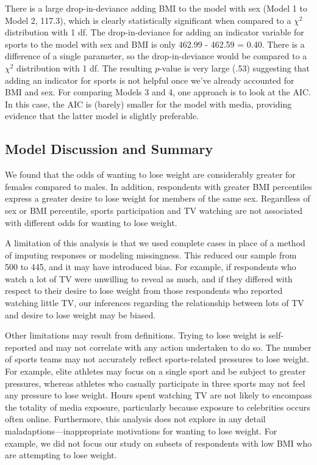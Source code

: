 \documentclass[
]{krantz}
\begin{document}
There is a large drop-in-deviance adding BMI to the model with sex (Model 1 to Model 2, 117.3), which is clearly statistically significant when compared to a \(\chi^2\) distribution with 1 df. The drop-in-deviance for adding an indicator variable for sports to the model with sex and BMI is only 462.99 - 462.59 = 0.40. There is a difference of a single parameter, so the drop-in-deviance would be compared to a \(\chi^2\) distribution with 1 df. The resulting \(p\)-value is very large (.53) suggesting that adding an indicator for sports is not helpful once we've already accounted for BMI and sex. For comparing Models 3 and 4, one approach is to look at the AIC. In this case, the AIC is (barely) smaller for the model with media, providing evidence that the latter model is slightly preferable.

\subsection{Model Discussion and Summary}\label{model-discussion-and-summary}

We found that the odds of wanting to lose weight are considerably greater for females compared to males. In addition, respondents with greater BMI percentiles express a greater desire to lose weight for members of the same sex. Regardless of sex or BMI percentile, sports participation and TV watching are not associated with different odds for wanting to lose weight.

A limitation of this analysis is that we used complete cases in place of a method of imputing responses or modeling missingness. This reduced our sample from 500 to 445, and it may have introduced bias. For example, if respondents who watch a lot of TV were unwilling to reveal as much, and if they differed with respect to their desire to lose weight from those respondents who reported watching little TV, our inferences regarding the relationship between lots of TV and desire to lose weight may be biased.

Other limitations may result from definitions. Trying to lose weight is self-reported and may not correlate with any action undertaken to do so. The number of sports teams may not accurately reflect sports-related pressures to lose weight. For example, elite athletes may focus on a single sport and be subject to greater pressures, whereas athletes who casually participate in three sports may not feel any pressure to lose weight. Hours spent watching TV are not likely to encompass the totality of media exposure, particularly because exposure to celebrities occurs often online. Furthermore, this analysis does not explore in any detail maladaptions---inappropriate motivations for wanting to lose weight. For example, we did not focus our study on subsets of respondents with low BMI who are attempting to lose weight.
\end{document}
